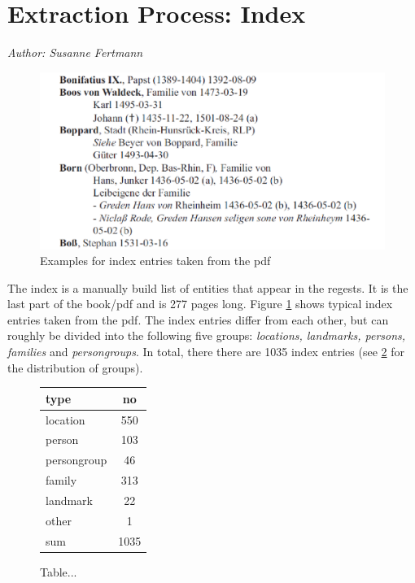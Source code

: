 \section{Extraction Process: Index}
\label{sec:index}

\emph{Author: Susanne Fertmann} \\

\begin{figure}[h]
  \centering
  \includegraphics[scale=0.3]{img/index-examples}
  \caption{Examples for index entries taken from the pdf}
  \label{fig:index-examples}
\end{figure}
The index is a manually build list of entities that appear in the regests. It is the last part of the book/pdf and is 277 pages long. Figure \ref{fig:index-examples} shows typical index entries taken from the pdf. The index entries differ from each other, but can roughly be divided into the following five groups: \textit{locations, landmarks, persons, families} and \textit{persongroups}. In total, there there are 1035 index entries (see \ref{fig:type-table} for the distribution of groups). 

\begin{figure}[h]
\centering
\begin{tabular}{|l|c|}
\hline
type        & no  \\
\hline
location    & 550 \\
person      & 103 \\
persongroup & 46  \\
family      & 313 \\
landmark    & 22  \\
other       & 1   \\
\hline
sum         & 1035\\
\hline
\end{tabular} 
\caption{Table...}
\label{fig:type-table}
\end{figure}

